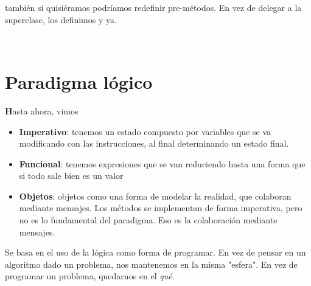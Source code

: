 \documentclass{report}
\theoremstyle{definition} %
\newenvironment{nota}[1]
    {\begin{leftbar}\textbf{#1}}
    {\end{leftbar}}
\begin{document}
también si quisiéramos podríamos redefinir pre-métodos. En vez de delegar a la
superclase, los definimos y ya.


\newcommand{\no}[1]{\neg #1}
\newcommand{\y}[2]{#1 \wedge #2}\
\newcommand{\por}[2]{#1 \vee #2}
\newcommand{\impl}[2]{#1 \supset #2}
\newcommand{\sii}[2]{#1 \iff #2}

\newcommand{\propVars}{\mathcal{V}}

\newcommand{\sat}[2]{#1 \models #2}
\newcommand{\nsat}[2]{#1 \not\models #2}

\newcommand{\set}[1]{\{ #1 \}} %
\newcommand{\emptyCl}{\square} %
\newcommand{\opuesto}[1]{\overline{#1}}
\newcommand{\resol}[2]{\trfrac{#1}{#2}}

\newcommand{\LPO}{\mathcal{L}}
\newcommand{\paratodo}[2]{\forall #1 . #2}
\newcommand{\existe}[2]{\exists #1 . #2}

\newcommand{\lpoass}[3]{#1[#2 \gets #3]}
\newcommand{\posat}[1]{s \models_M #1}
\newcommand{\notposat}[1]{s \not\models_M #1}

\newcommand{\sk}[1]{\text{\textbf{SK}}(#1)} %

\chapter{Paradigma lógico}

\begin{nota}
    Hasta ahora, vimos

    \begin{itemize}
        \item \textbf{Imperativo}: tenemos un estado compuesto por variables que
        se va modificando con las instrucciones, al final determinando un estado
        final.
        \item \textbf{Funcional}: tenemos expresiones que se van reduciendo
        hasta una forma que si todo sale bien es un valor
        \item \textbf{Objetos}: objetos como una forma de modelar la realidad,
        que colaboran mediante mensajes. Los métodos se implementan de forma
        imperativa, pero no es lo fundamental del paradigma. Eso es la
        colaboración mediante mensajes.
    \end{itemize}
\end{nota}

Se basa en el uso de la lógica como forma de programar. En vez de pensar en un
algoritmo dado un problema, nos mantenemos en la misma "esfera". En vez de
programar un problema, quedarnos en el \textit{qué}.
\end{document}

